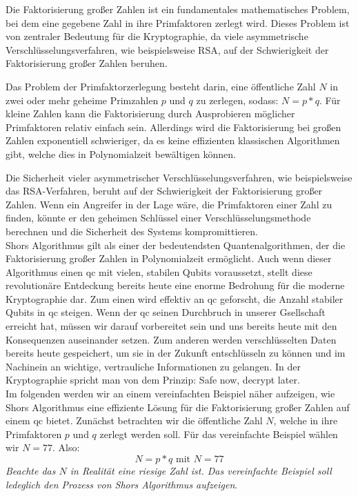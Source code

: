 Die Faktorisierung großer Zahlen \cite[S189]{bernstein_post-quantum_2017} ist ein fundamentales mathematisches Problem, 
bei dem eine gegebene Zahl in ihre Primfaktoren zerlegt wird.
Dieses Problem ist von zentraler Bedeutung für die Kryptographie, da viele asymmetrische Verschlüsselungsverfahren, wie beispielsweise RSA, 
auf der Schwierigkeit der Faktorisierung großer Zahlen beruhen.

Das Problem der Primfaktorzerlegung besteht darin, eine öffentliche Zahl $N$ in zwei oder mehr geheime Primzahlen $p$ und $q$ zu zerlegen, sodass: $N = p*q$. 
Für kleine Zahlen kann die Faktorisierung durch Ausprobieren möglicher Primfaktoren relativ einfach sein. 
Allerdings wird die Faktorisierung bei großen Zahlen exponentiell schwieriger, 
da es keine effizienten klassischen Algorithmen gibt, welche dies in Polynomialzeit bewältigen können.

Die Sicherheit vieler asymmetrischer Verschlüsselungsverfahren, 
wie beispielsweise das RSA-Verfahren, beruht auf der Schwierigkeit der Faktorisierung großer Zahlen. 
Wenn ein Angreifer in der Lage wäre, die Primfaktoren einer Zahl zu finden, 
könnte er den geheimen Schlüssel einer Verschlüsselungsmethode berechnen und die Sicherheit des Systems kompromittieren.\\

Shors Algorithmus \cite{shor_algorithms_1994} gilt als einer der bedeutendsten Quantenalgorithmen, 
der die Faktorisierung großer Zahlen in Polynomialzeit ermöglicht. 
Auch wenn dieser Algorithmus einen \ac{qc} mit vielen, stabilen Qubits voraussetzt, 
stellt diese revolutionäre Entdeckung bereits heute eine enorme Bedrohung für die moderne Kryptographie dar.
Zum einen wird effektiv an \ac{qc} geforscht, die Anzahl stabiler Qubits in \ac{qc} steigen. 
Wenn der \ac{qc} seinen Durchbruch in unserer Gsellschaft erreicht hat, müssen wir darauf vorbereitet sein und uns bereits heute mit den Konsequenzen auseinander setzen. 
Zum anderen werden verschlüsselten Daten bereits heute gespeichert, um sie in der Zukunft entschlüsseln zu können und 
im Nachinein an wichtige, vertrauliche Informationen zu gelangen. In der Kryptographie spricht man von dem Prinzip: \glqq Safe now, decrypt later\grqq.\\

Im folgenden \cite{kak_lecture_nodate}\cite[S. 4-5]{gidney_how_2021} werden wir an einem vereinfachten Beispiel näher aufzeigen, 
wie Shors Algorithmus eine effiziente Lösung für die Faktorisierung großer Zahlen auf einem \ac{qc} bietet.
Zunächst betrachten wir die öffentliche Zahl $N$, welche in ihre Primfaktoren $p$ und $q$ zerlegt werden soll. 
Für das vereinfachte Beispiel wählen wir $N = 77$. Also: $$N = p*q \textrm{ mit } N= 77$$
\textit{Beachte das $N$ in Realität eine riesige Zahl ist. Das vereinfachte Beispiel soll ledeglich den Prozess von Shors Algorithmus aufzeigen}.

